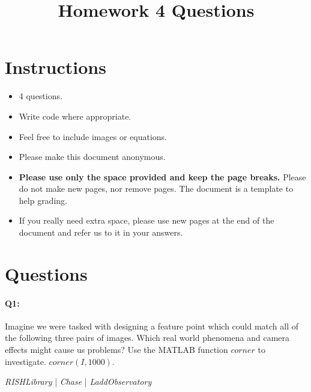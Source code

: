 \title{\vspace{-1cm}Homework 4 Questions}



\maketitle
\vspace{-3cm}
\thispagestyle{fancy}

\section*{Instructions}
\begin{itemize}
  \item 4 questions.
  \item Write code where appropriate.
  \item Feel free to include images or equations.
  \item Please make this document anonymous.
  \item \textbf{Please use only the space provided and keep the page breaks.} Please do not make new pages, nor remove pages. The document is a template to help grading.
  \item If you really need extra space, please use new pages at the end of the document and refer us to it in your answers.
\end{itemize}

\section*{Questions}

\paragraph{Q1:} Imagine we were tasked with designing a feature point which could match all of the following three pairs of images. Which real world phenomena and camera effects might cause us problems?
Use the MATLAB function \href{https://www.mathworks.com/help/images/ref/corner.html}{$corner$} to investigate. $corner(I,1000)$.

\emph{RISHLibrary} | \emph{Chase} | \emph{LaddObservatory}

